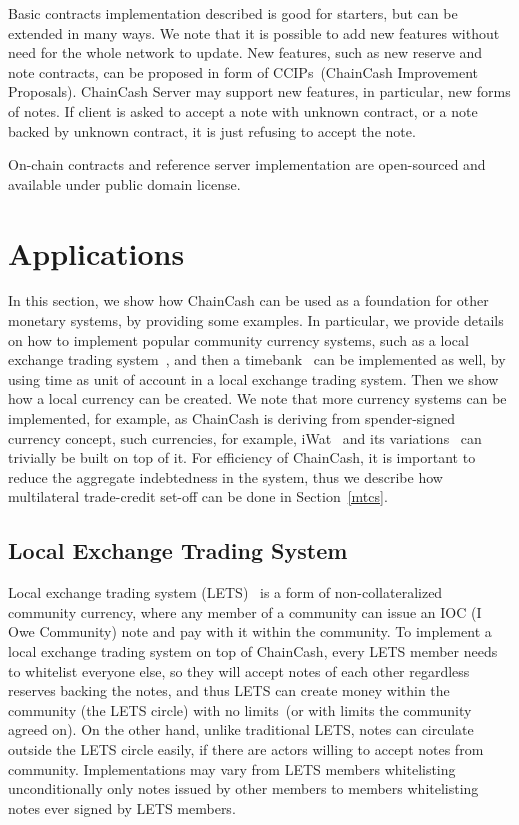 \documentclass{llncs}   %
\newcommand{\cc}{ChainCash}
\begin{document}

Basic contracts implementation described is good for starters, but can be extended in many ways.  We note that it is possible
to add new features without need for the whole network to update. New features, such as new reserve and note contracts,
can be proposed in form of CCIPs~(ChainCash Improvement Proposals). ChainCash
Server may support new features, in particular, new forms of notes. If client is asked to accept a note with unknown
contract, or a note backed by unknown contract, it is just refusing to accept the note.

On-chain contracts and reference server implementation are open-sourced and available under public domain license.

\section{Applications}
\label{sec-apps}

In this section, we show how \cc{} can be used as a foundation for other monetary systems, by providing some examples.
In particular, we provide details on how to implement popular community currency systems, such as a local exchange trading
 system~\cite{williams1996new}, and then a timebank~\cite{mcquaid2004review} can be implemented as well, by using time
as unit of account in a local exchange trading system. Then we show how a local currency can be created. We note that more currency systems can be
implemented, for example, as \cc{} is deriving from spender-signed currency concept, such currencies, for example,
iWat~\cite{saito2003peer} and its variations~\cite{saito2005wot,saito2005multiplication,saito2006reduction} can
trivially be built on top of it. For efficiency of \cc{}, it is important to reduce the aggregate indebtedness in the system,
thus we describe how multilateral trade-credit set-off can be done in Section~\ref{mtcs}.

\subsection{Local Exchange Trading System}

Local exchange trading system (LETS)~\cite{williams1996new} is a form of non-collateralized community currency, where any member of a community
can issue an IOC (I Owe Community) note and pay with it within the community.
To implement a local exchange trading system on top of \cc{}, every LETS member needs to whitelist everyone else, so
they will accept notes of each other regardless reserves backing the notes, and thus LETS can create money within the community (the LETS circle) with no limits~(or with limits the community agreed on). On the other hand, unlike traditional LETS, notes can circulate outside the LETS circle easily, if there are actors willing to accept notes from community. Implementations may vary from LETS members whitelisting unconditionally only notes issued by other members to members whitelisting notes ever signed by LETS members.
\end{document}
